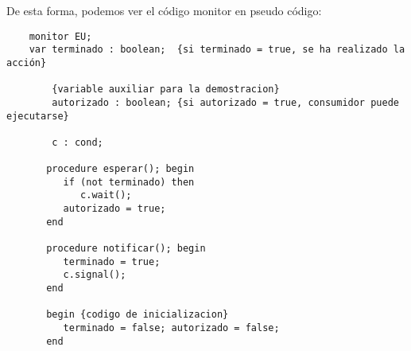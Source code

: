De esta forma, podemos ver el código monitor en pseudo código:
\begin{verbatim}
    monitor EU;
    var terminado : boolean;  {si terminado = true, se ha realizado la acción}

        {variable auxiliar para la demostracion}
        autorizado : boolean; {si autorizado = true, consumidor puede ejecutarse}

        c : cond;

       procedure esperar(); begin
          if (not terminado) then
             c.wait();
          autorizado = true;
       end

       procedure notificar(); begin
          terminado = true; 
          c.signal();
       end

       begin {codigo de inicializacion}
          terminado = false; autorizado = false;
       end
\end{verbatim}

